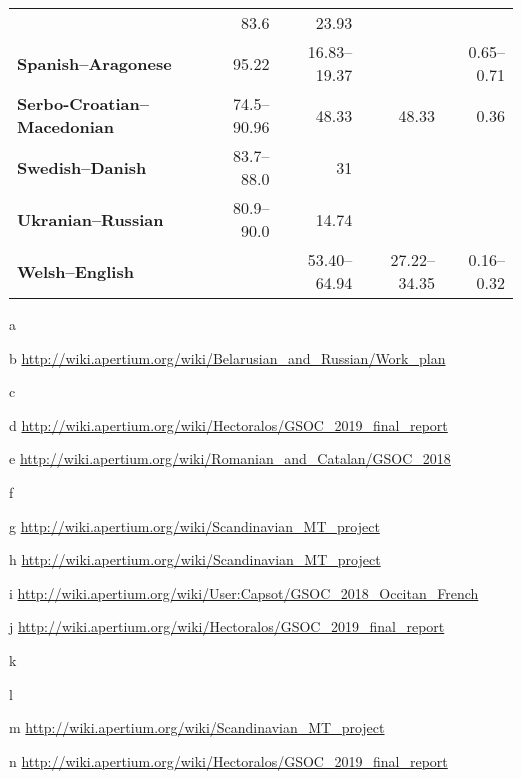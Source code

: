 \documentclass[free]{flammie}
\begin{document}
\begin{table*}[ht]
{\begin{threeparttable}
\begin{tabular}{lrrrr}
&83.6&23.93&  & \\
\textbf{Spanish--Aragonese}\tnote{r} &95.22&16.83--19.37&&0.65--0.71 \\
\textbf{Serbo-Croatian--Macedonian}\tnote{s}
&74.5--90.96&48.33&48.33&0.36 \\
\textbf{Swedish--Danish}\tnote{t}
&83.7--88.0&31&  & \\
\textbf{Ukranian--Russian}\tnote{p}&80.9--90.0&14.74&& \\
\textbf{Welsh--English}\tnote{u}
&&53.40--64.94&27.22--34.35&0.16--0.32 \\
\bottomrule
\end{tabular}
\begin{tablenotes}
\item[a] \cite{martinez2012free} \\
\item[b] \url{http://wiki.apertium.org/wiki/Belarusian_and_Russian/Work_plan} \\
\item[c] \cite{tyers2009rule, tyers2010rule} \\
\item[d] \url{http://wiki.apertium.org/wiki/Hectoralos/GSOC_2019_final_report} \\
\item[e] \url{http://wiki.apertium.org/wiki/Romanian_and_Catalan/GSOC_2018} \\
\item[f] \cite{fronteddu2017eina} \\
\item[g] \url{http://wiki.apertium.org/wiki/Scandinavian_MT_project}\\
\item[h] \url{http://wiki.apertium.org/wiki/Scandinavian_MT_project} \\
\item[i] \url{http://wiki.apertium.org/wiki/User:Capsot/GSOC_2018_Occitan_French}\\
\item[j] \url{http://wiki.apertium.org/wiki/Hectoralos/GSOC_2019_final_report} \\
\item[k] \cite{tyers2017rule} \\
\item[l] \cite{trosterud2012evaluating} \\
\item[m] \url{http://wiki.apertium.org/wiki/Scandinavian_MT_project} \\
\item[n] \url{http://wiki.apertium.org/wiki/Hectoralos/GSOC_2019_final_report} \\

\end{tablenotes}
\end{threeparttable}}
\end{table*}
\end{document}
